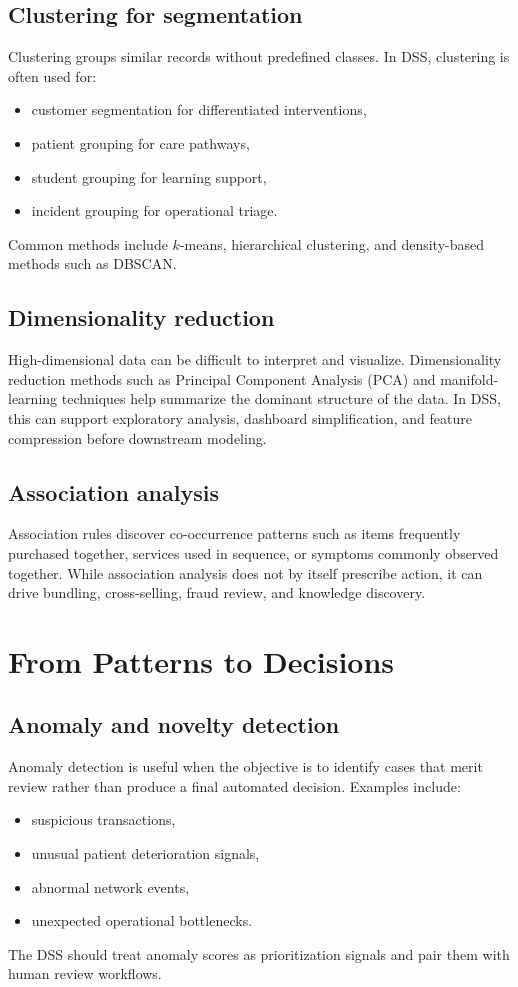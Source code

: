 \subsection{Clustering for segmentation}
Clustering groups similar records without predefined classes. In DSS,
clustering is often used for:
\begin{itemize}
  \item customer segmentation for differentiated interventions,
  \item patient grouping for care pathways,
  \item student grouping for learning support,
  \item incident grouping for operational triage.
\end{itemize}
Common methods include $k$-means, hierarchical clustering, and density-based
methods such as DBSCAN.

\subsection{Dimensionality reduction}
High-dimensional data can be difficult to interpret and visualize.
Dimensionality reduction methods such as Principal Component Analysis (PCA) and
manifold-learning techniques help summarize the dominant structure of the data.
In DSS, this can support exploratory analysis, dashboard simplification, and
feature compression before downstream modeling.

\subsection{Association analysis}
Association rules discover co-occurrence patterns such as items frequently
purchased together, services used in sequence, or symptoms commonly observed
together. While association analysis does not by itself prescribe action, it
can drive bundling, cross-selling, fraud review, and knowledge discovery.

\section{From Patterns to Decisions}

\subsection{Anomaly and novelty detection}
Anomaly detection is useful when the objective is to identify cases that merit
review rather than produce a final automated decision. Examples include:
\begin{itemize}
  \item suspicious transactions,
  \item unusual patient deterioration signals,
  \item abnormal network events,
  \item unexpected operational bottlenecks.
\end{itemize}
The DSS should treat anomaly scores as prioritization signals and pair them
with human review workflows.

